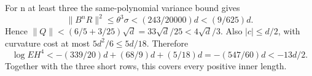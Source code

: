 For n at least three the same-polynomial variance bound gives
\[
\|B^nR\|^2\le\theta^3\sigma<(243/20000)d<(9/625)d.
\]
Hence \(\|Q\|<(6/5+3/25)\sqrt d=33\sqrt d/25<4\sqrt d/3\). Also \(|c|\le d/2\), with curvature cost at most \(5d^2/6\le5d/18\). Therefore
\[
\log EH^4<-(339/20)d+(68/9)d+(5/18)d
=-(547/60)d<-13d/2.
\tag{C170.T178.21}
\]
Together with the three short rows, this covers every positive inner length.
